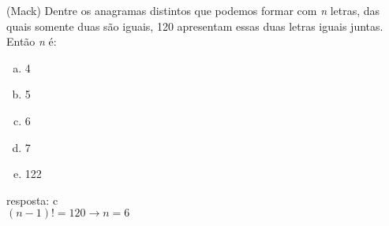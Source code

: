 \begin{ex}
 (Mack) Dentre os anagramas distintos que podemos formar com \textit{n} letras, das quais somente  duas são iguais, 120 apresentam essas duas letras iguais juntas. Então \textit{n} é:
    \begin{enumerate}[(a)]
    \item 4
    \item 5
    \item 6
    \item 7
    \item 122
    \end{enumerate}
      \begin{sol}
        resposta: c \\
        $(n-1)!=120 \longrightarrow n=6 $
      \end{sol}
\end{ex}